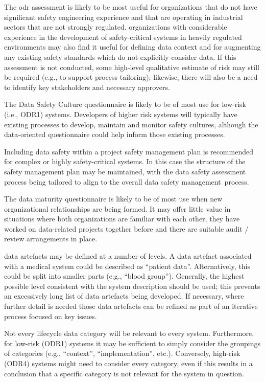 The \gls{odr} assessment is likely to be most useful for organizations that do not have significant safety engineering experience and that are operating in industrial sectors that are not strongly regulated.
organizations with considerable experience in the development of safety-critical systems in heavily regulated environments
may also find it useful for defining data context and for augmenting any existing safety standards which do not explicitly consider data.
If this assessment is not conducted, some high-level qualitative estimate of risk may still be required (e.g., to support process \gls{tailoring}); likewise, there will also be a need to identify key \glspl{stakeholder} and necessary approvers.

The Data Safety Culture questionnaire is likely to be of most use for low-risk (i.e., ODR1) systems. Developers of higher risk systems will typically have existing processes to develop, maintain and monitor safety cultures, although the data-oriented questionnaire could help inform those existing processes.

Including data safety within a project safety management plan is recommended for complex or highly safety-critical systems. In this case the structure of the safety management plan may be maintained, with the \gls{data safety assessment} process being tailored to align to the overall \cbstart data safety management\cbend\ process.

The data maturity questionnaire is likely to be of most use when new organizational relationships are being formed. It may offer little value in situations where both organizations are familiar with each other, they have worked on data-related projects together before and there are suitable audit / review arrangements in place.

\Glspl{data artefact} may be defined at a number of levels. A \gls{data artefact} associated with a medical system could be described as ``patient data''. Alternatively, this could be split into smaller parts (e.g., ``blood group''). Generally, the highest possible level consistent with the system description should be used; this prevents an excessively long list of \glspl{data artefact} being developed. If necessary, where further detail is needed those \glspl{data artefact} can be refined as part of an iterative process focused on key issues.

Not every lifecycle data category will be relevant to every system. Furthermore, for low-risk (ODR1) systems it may be sufficient to simply consider the groupings of categories (e.g., ``context'', ``implementation'', etc.). Conversely, high-risk (ODR4) systems might need to consider every category, even if this results in a conclusion that a specific category is not relevant for the system in question.

